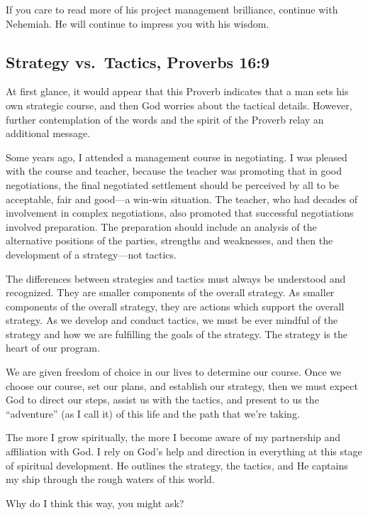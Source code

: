 \documentclass[12pt]{memoir}
\begin{document}
If you care to read more of his project management brilliance, continue with Nehemiah. He will continue to impress you with his wisdom. 

\subsection[Strategy vs.\ Tactics]{Strategy vs.\ Tactics, Proverbs 16:9}
 


At first glance, it would appear that this Proverb indicates that a man sets his own strategic course, and then God worries about the tactical details. However, further contemplation of the words and the spirit of the Proverb relay an additional message. 

Some years ago, I attended a management course in negotiating. I was
pleased with the course and teacher, because the teacher was promoting
that in good negotiations, the final negotiated settlement should
be perceived by all to be acceptable, fair and good---a win-win situation. The teacher, who had decades of involvement in complex negotiations,
also promoted that successful negotiations involved preparation. The
preparation should include an analysis of the alternative positions
of the parties, strengths and weaknesses, and then the development
of a strategy---not tactics.

The differences between strategies and tactics must always be understood and recognized. They are smaller components of the overall strategy. As smaller components of the overall strategy, they are actions which support the overall strategy. As we develop and conduct tactics, we must be ever mindful of the strategy and how we are fulfilling the goals of the strategy. The strategy
is the heart of our program. 

We are given freedom of choice in our lives to determine our course. Once we choose our course, set our plans, and establish our strategy, then we must expect God to direct our steps, assist us with the tactics, and present to us the ``adventure'' (as I call
it) of this life and the path that we're taking.

The more I grow spiritually, the more I become aware of my partnership
and affiliation with God. I rely on God's help and direction in everything at this stage of spiritual development. He outlines the strategy, the tactics, and He captains my ship through the rough waters of this world.

Why do I think this way, you might ask?
\end{document}
